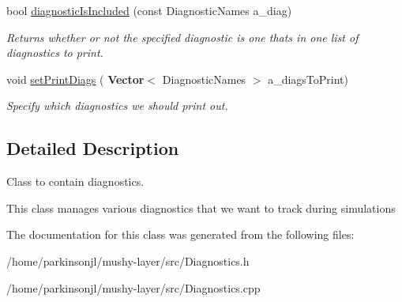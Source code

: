 \begin{DoxyCompactItemize}
\mbox{\label{class_diagnostics_a353154c0cde50ea837d2039fa677beff}} 
bool \hyperlink{class_diagnostics_a353154c0cde50ea837d2039fa677beff}{diagnostic\+Is\+Included} (const Diagnostic\+Names a\+\_\+diag)
\begin{DoxyCompactList}\small\item\em Returns whether or not the specified diagnostic is one that\textquotesingle{}s in one list of diagnostics to print. \end{DoxyCompactList}\item 
\mbox{\label{class_diagnostics_a9155bd661687675e51a2b8a1cd8e61cf}} 
void \hyperlink{class_diagnostics_a9155bd661687675e51a2b8a1cd8e61cf}{set\+Print\+Diags} (\textbf{ Vector}$<$ Diagnostic\+Names $>$ a\+\_\+diags\+To\+Print)
\begin{DoxyCompactList}\small\item\em Specify which diagnostics we should print out. \end{DoxyCompactList}\end{DoxyCompactItemize}


\subsection{Detailed Description}
Class to contain diagnostics. 

This class manages various diagnostics that we want to track during simulations 

The documentation for this class was generated from the following files\+:\begin{DoxyCompactItemize}
\item 
/home/parkinsonjl/mushy-\/layer/src/Diagnostics.\+h\item 
/home/parkinsonjl/mushy-\/layer/src/Diagnostics.\+cpp\end{DoxyCompactItemize}
